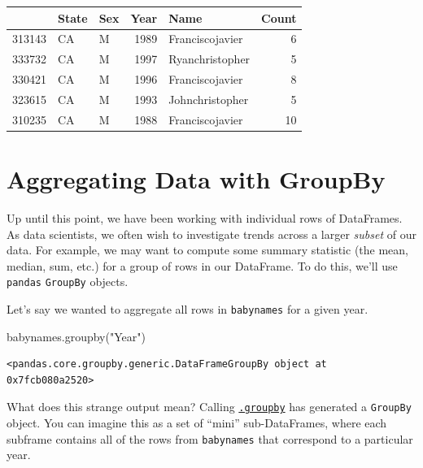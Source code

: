 \documentclass[
  letterpaper,
  DIV=11,
  numbers=noendperiod]{scrreprt}
\newenvironment{Shaded}{\begin{snugshade}}{\end{snugshade}}
\newcommand{\NormalTok}[1]{\textcolor[rgb]{0.00,0.23,0.31}{#1}}
\newcommand{\StringTok}[1]{\textcolor[rgb]{0.13,0.47,0.30}{#1}}
\begin{document}
\begin{tabular}{lllrlr}
\toprule
{} & State & Sex &  Year &             Name &  Count \\
\midrule
313143 &    CA &   M &  1989 &  Franciscojavier &      6 \\
333732 &    CA &   M &  1997 &  Ryanchristopher &      5 \\
330421 &    CA &   M &  1996 &  Franciscojavier &      8 \\
323615 &    CA &   M &  1993 &  Johnchristopher &      5 \\
310235 &    CA &   M &  1988 &  Franciscojavier &     10 \\
\bottomrule
\end{tabular}

\hypertarget{aggregating-data-with-groupby}{%
\section{Aggregating Data with
GroupBy}\label{aggregating-data-with-groupby}}

Up until this point, we have been working with individual rows of
DataFrames. As data scientists, we often wish to investigate trends
across a larger \emph{subset} of our data. For example, we may want to
compute some summary statistic (the mean, median, sum, etc.) for a group
of rows in our DataFrame. To do this, we'll use \texttt{pandas}
\texttt{GroupBy} objects.

Let's say we wanted to aggregate all rows in \texttt{babynames} for a
given year.

\begin{Shaded}
\begin{Highlighting}[]
\NormalTok{babynames.groupby(}\StringTok{"Year"}\NormalTok{)}
\end{Highlighting}
\end{Shaded}

\begin{verbatim}
<pandas.core.groupby.generic.DataFrameGroupBy object at 0x7fcb080a2520>
\end{verbatim}

What does this strange output mean? Calling
\href{https://pandas.pydata.org/pandas-docs/stable/reference/api/pandas.DataFrame.groupby.html}{\texttt{.groupby}}
has generated a \texttt{GroupBy} object. You can imagine this as a set
of ``mini'' sub-DataFrames, where each subframe contains all of the rows
from \texttt{babynames} that correspond to a particular year.
\end{document}
